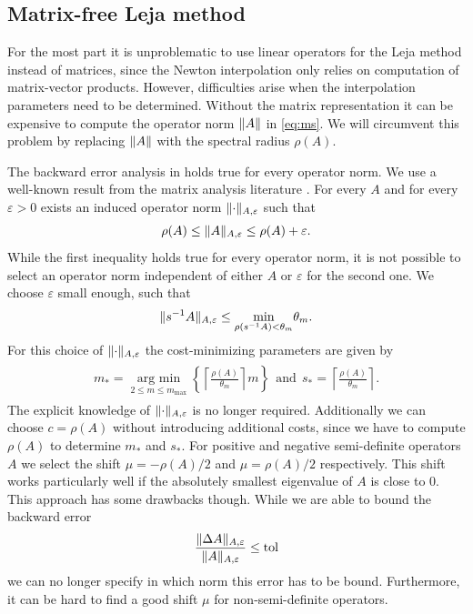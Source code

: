\documentclass{scrartcl}
\begin{document}
	\subsection{Matrix-free Leja method} \label{sec:MatrixFreeLejaMethod}
	For the most part it is unproblematic to use linear operators for the Leja method instead of matrices, since the Newton interpolation only relies on computation of matrix-vector products. However, difficulties arise when the interpolation parameters need to be determined. Without the matrix representation it can be expensive to compute the operator norm $\lVert A\rVert$ in \eqref{eq:ms}. We will circumvent this problem by replacing $\lVert A\rVert$ with the spectral radius $\rho(A)$. 
	
	The backward error analysis in \cite{lejarev} holds true for every operator norm.
	We use a well-known result from the matrix analysis literature \cite[Lemma 5.6.10.]{matrixanalysis}. For every $A$ and for every $\varepsilon>0$ exists an induced operator norm $\lVert\cdot\rVert_{A,\varepsilon}$ such that
	\[
	\rho(A) \le \lVert A\rVert_{A,\varepsilon} \le \rho(A) + \varepsilon. 
	\]
	While the first inequality holds true for every operator norm, it is not possible to select an operator norm independent of either $A$ or $\varepsilon$ for the second one. We choose $\varepsilon$ small enough, such that
	\[
	\lVert s^{-1}A\rVert_{A,\varepsilon} \le \underset{\rho(s^{-1}A) < \theta_m}{\min}\theta_m.
	\]
	For this choice of $\lVert\cdot\rVert_{A,\varepsilon}$ the cost-minimizing parameters are given by
	\begin{align}
	\begin{split}
	m_* = \underset{2\le m\le m_{\operatorname{max}}}{\operatorname{arg\ min}}  \left\{{\left\lceil{\frac{\rho(A)}{\theta_m}}\right\rceil}m\right\} ~~\text{and}~~
	s_* =  \left\lceil{\frac{\rho(A)}{\theta_m}}\right\rceil.
	\end{split}\label{eq:msmatrixfree}
	\end{align}
	The explicit knowledge of $\lVert\cdot\rVert_{A,\varepsilon}$ is no longer required. Additionally we can choose $c=\rho(A)$ without introducing additional costs, since we have to compute $\rho(A)$ to determine $m_*$ and $s_*$. 
	For positive and negative semi-definite operators $A$ we select the shift $\mu = -\rho(A)/2$ and $\mu = \rho(A)/2$ respectively. This shift works particularly well if the absolutely smallest eigenvalue of $A$ is close to $0$.\\
	This approach has some drawbacks though. While we are able to bound the backward error
	\[
	\frac{\lVert\Delta A\rVert_{A,\varepsilon}}{\lVert A\rVert_{A,\varepsilon}} \le \operatorname{tol}  
	\]
	we can no longer specify in which norm this error has to be bound. Furthermore, it can be hard to find a good shift $\mu$ for non-semi-definite operators.
\end{document}
